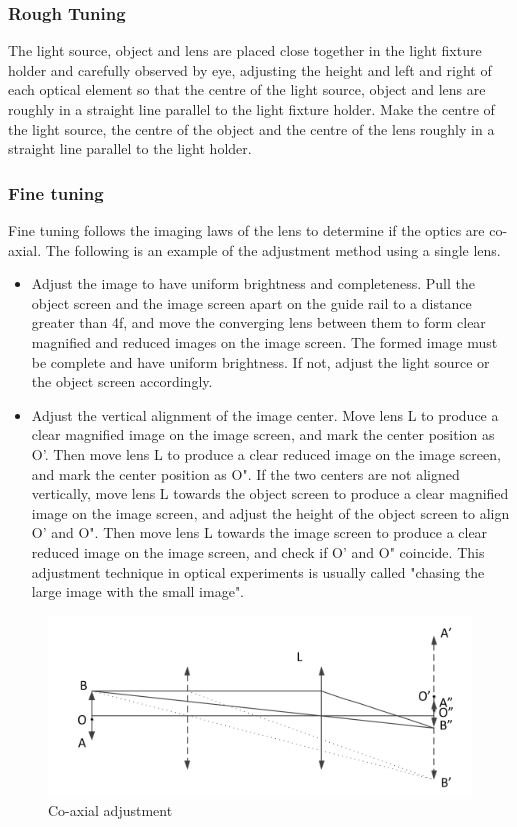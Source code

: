 \documentclass[UTF8]{article}
\begin{document}
	\subsubsection{Rough Tuning}
	The light source, object and lens are placed close together in the light fixture holder and carefully observed by eye, adjusting the height and left and right of each optical element so that the centre of the light source, object and lens are roughly in a straight line parallel to the light fixture holder. Make the centre of the light source, the centre of the object and the centre of the lens roughly in a straight line parallel to the light holder.
	
	\subsubsection{Fine tuning}
	Fine tuning follows the imaging laws of the lens to determine if the optics are co-axial. The following is an example of the adjustment method using a single lens.
	\begin{itemize}
	\item Adjust the image to have uniform brightness and completeness. Pull the object screen and the image screen apart on the guide rail to a distance greater than 4f, and move the converging lens between them to form clear magnified and reduced images on the image screen. The formed image must be complete and have uniform brightness. If not, adjust the light source or the object screen accordingly.
    \item Adjust the vertical alignment of the image center. Move lens L to produce a clear magnified image on the image screen, and mark the center position as O'. Then move lens L to produce a clear reduced image on the image screen, and mark the center position as O". If the two centers are not aligned vertically, move lens L towards the object screen to produce a clear magnified image on the image screen, and adjust the height of the object screen to align O' and O". Then move lens L towards the image screen to produce a clear reduced image on the image screen, and check if O' and O" coincide. This adjustment technique in optical experiments is usually called "chasing the large image with the small image".
    \end{itemize}
    
    \begin{figure}[H]
        	     	\centering
        	     	\includegraphics[clip,scale=1,trim={0 0 0 0}]{fig/fig10.png}
        	     	\caption{Co-axial adjustment}
        	     	\label{figure.10}
     \end{figure}
    
\end{document}

